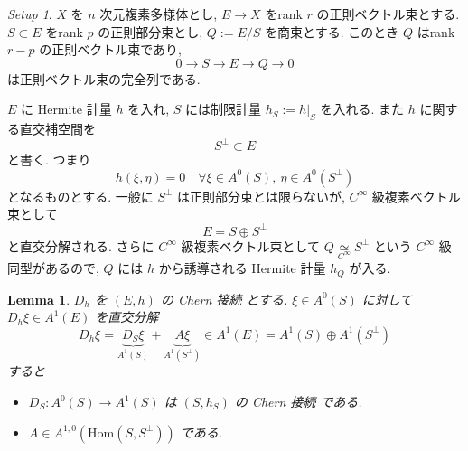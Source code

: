 \documentclass[dvipdfmx,a4paper,11pt]{article} %
\newtheorem{lem}[thm]{Lemma}
\theoremstyle{definition}
\theoremstyle{remark}
\newtheorem{setup}[thm]{Setup}
\numberwithin{equation}{section}
\newcommand{\Hom}[0]{\mathrm{Hom}}
\begin{document}
\begin{tcolorbox}[mybox]
\begin{setup}
\(X\) を \(n\) 次元複素多様体とし, \(E\to X\) をrank \(r\) の正則ベクトル束とする. \(S\subset E\) をrank \(p\) の正則部分束とし,
\(
Q:=E/S
\)
を商束とする. このとき \(Q\) はrank \(r-p\) の正則ベクトル束であり,
\[
0\longrightarrow S\longrightarrow E\longrightarrow Q\longrightarrow 0
\]
は正則ベクトル束の完全列である.

\(E\) に Hermite 計量 \(h\) を入れ, \(S\) には制限計量 \(h_S:=h|_S\) を入れる. また \(h\) に関する直交補空間を
\[
S^\perp\subset E
\]
と書く. つまり
\begin{equation}
\label{eq-orthogonal}
h(\xi, \eta)=0 \quad \forall \xi\in A^0(S),\ \eta \in A^0(S^\perp) 
\end{equation}
となるものとする. 一般に \(S^\perp\) は正則部分束とは限らないが, \(C^\infty\) 級複素ベクトル束として
\[
E =S\oplus S^\perp
\]
と直交分解される. さらに \(C^\infty\) 級複素ベクトル束として \(Q\underset{C^{\infty}}{\simeq} S^\perp\) という \(C^{\infty}\) 級同型があるので, \(Q\) には \(h\) から誘導される Hermite 計量 \(h_Q\) が入る.
\end{setup}
\end{tcolorbox}

\begin{lem}
\label{lem-exact-chern}
\(D_h\) を \((E,h)\) の Chern 接続 とする. \(\xi\in A^0(S)\) に対して \(D_h\xi\in A^1(E)\) を直交分解
\begin{equation}
\label{eq-Chern-exact}
D_h\xi=\underbrace{D_S\xi}_{A^1(S)}+
\underbrace{A\xi}_{A^1(S^\perp)} 
\in A^1(E)=A^1(S) \oplus A^1(S^{\perp}) 
\end{equation}
すると
\begin{itemize}
\item \(D_S : A^0(S)\to A^1(S)\) は \((S,h_S)\) の Chern 接続 である.
\item \(A\in A^{1,0}(\Hom(S,S^\perp))\) である.
\end{itemize}
\end{lem}
\end{document}

